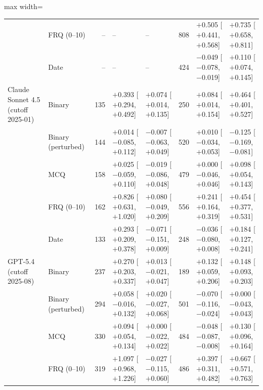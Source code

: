 \begin{table}[htbp]
\begin{adjustbox}{max width=\textwidth}
\begin{tabular}{l l r l l r l l}
 & FRQ (0--10) & -- & -- & -- & 808 & $+$0.505 {\scriptsize[$+$0.441, $+$0.568]} & $+$0.735 {\scriptsize[$+$0.658, $+$0.811]} \\
 & Date & -- & -- & -- & 424 & $-$0.049 {\scriptsize[$-$0.078, $-$0.019]} & $+$0.110 {\scriptsize[$+$0.074, $+$0.145]} \\
\addlinespace
Claude Sonnet 4.5 (cutoff 2025-01) & Binary & 135 & $+$0.393 {\scriptsize[$+$0.294, $+$0.492]} & $+$0.074 {\scriptsize[$+$0.014, $+$0.135]} & 250 & $+$0.084 {\scriptsize[$+$0.014, $+$0.154]} & $+$0.464 {\scriptsize[$+$0.401, $+$0.527]} \\
 & Binary (perturbed) & 144 & $+$0.014 {\scriptsize[$-$0.085, $+$0.112]} & $-$0.007 {\scriptsize[$-$0.063, $+$0.049]} & 520 & $+$0.010 {\scriptsize[$-$0.034, $+$0.053]} & $-$0.125 {\scriptsize[$-$0.169, $-$0.081]} \\
 & MCQ & 158 & $+$0.025 {\scriptsize[$-$0.059, $+$0.110]} & $-$0.019 {\scriptsize[$-$0.086, $+$0.048]} & 479 & $+$0.000 {\scriptsize[$-$0.046, $+$0.046]} & $+$0.098 {\scriptsize[$+$0.054, $+$0.143]} \\
 & FRQ (0--10) & 162 & $+$0.826 {\scriptsize[$+$0.631, $+$1.020]} & $+$0.080 {\scriptsize[$-$0.049, $+$0.209]} & 556 & $+$0.241 {\scriptsize[$+$0.164, $+$0.319]} & $+$0.454 {\scriptsize[$+$0.377, $+$0.531]} \\
 & Date & 133 & $+$0.293 {\scriptsize[$+$0.209, $+$0.378]} & $-$0.071 {\scriptsize[$-$0.151, $+$0.009]} & 248 & $-$0.036 {\scriptsize[$-$0.080, $+$0.008]} & $+$0.184 {\scriptsize[$+$0.127, $+$0.241]} \\
\addlinespace
GPT-5.4 (cutoff 2025-08) & Binary & 237 & $+$0.270 {\scriptsize[$+$0.203, $+$0.337]} & $+$0.013 {\scriptsize[$-$0.021, $+$0.047]} & 189 & $+$0.132 {\scriptsize[$+$0.059, $+$0.206]} & $+$0.148 {\scriptsize[$+$0.093, $+$0.203]} \\
 & Binary (perturbed) & 294 & $+$0.058 {\scriptsize[$-$0.016, $+$0.132]} & $+$0.020 {\scriptsize[$-$0.027, $+$0.068]} & 501 & $-$0.070 {\scriptsize[$-$0.116, $-$0.024]} & $+$0.000 {\scriptsize[$-$0.043, $+$0.043]} \\
 & MCQ & 330 & $+$0.094 {\scriptsize[$+$0.054, $+$0.134]} & $+$0.000 {\scriptsize[$-$0.022, $+$0.022]} & 484 & $-$0.048 {\scriptsize[$-$0.087, $-$0.008]} & $+$0.130 {\scriptsize[$+$0.096, $+$0.164]} \\
 & FRQ (0--10) & 319 & $+$1.097 {\scriptsize[$+$0.968, $+$1.226]} & $-$0.027 {\scriptsize[$-$0.115, $+$0.060]} & 486 & $+$0.397 {\scriptsize[$+$0.311, $+$0.482]} & $+$0.667 {\scriptsize[$+$0.571, $+$0.763]} \\

\end{tabular}
\end{adjustbox}
\end{table}
